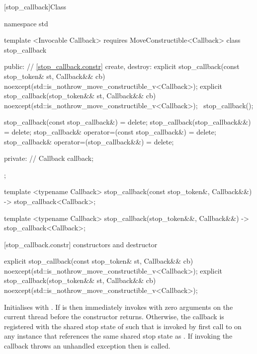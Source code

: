 {%
%
[stop_callback]{Class }

\pnum
{}%

\begin{codeblock}
namespace std {
  template <Invocable Callback>
    requires MoveConstructible<Callback>
  class stop_callback {
  public:
    // \ref{stop_callback.constr} create, destroy:
    explicit stop_callback(const stop_token& st, Callback&& cb)
        noexcept(std::is_nothrow_move_constructible_v<Callback>);
    explicit stop_callback(stop_token&& st, Callback&& cb)
        noexcept(std::is_nothrow_move_constructible_v<Callback>);
    ~stop_callback();

    stop_callback(const stop_callback&) = delete;
    stop_callback(stop_callback&&) = delete;
    stop_callback& operator=(const stop_callback&) = delete;
    stop_callback& operator=(stop_callback&&) = delete;

  private:
    // \expos
    Callback callback; 
  };

  template <typename Callback>
  stop_callback(const stop_token&, Callback&&) -> stop_callback<Callback>;

  template <typename Callback>
  stop_callback(stop_token&&, Callback&&) -> stop_callback<Callback>;
}
\end{codeblock}

[stop_callback.constr]{ constructors and destructor}

%
\begin{itemdecl}
explicit stop_callback(const stop_token& st, Callback&& cb)
  noexcept(std::is_nothrow_move_constructible_v<Callback>);
explicit stop_callback(stop_token&& st, Callback&& cb)
  noexcept(std::is_nothrow_move_constructible_v<Callback>);
\end{itemdecl}
\begin{itemdescr}
  \pnum\effects Initialises  with .
                If  is  then immediately invokes
                with zero arguments on the current thread before the constructor returns.
                Otherwise, the callback is registered with the shared stop state of 
                such that  is invoked by first call to 
                on any  instance  that references the same shared stop
                state as .
                If invoking the callback throws an unhandled exception then  is called.


\end{itemdescr}}
